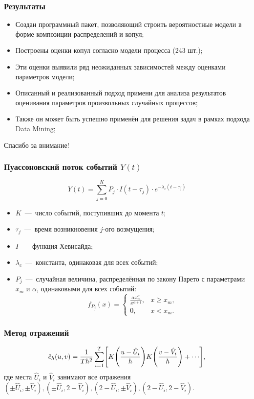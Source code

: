 \documentclass[11pt]{beamer}
\begin{document}
\begin{frame}
\begin{center}
\frametitle{Результаты}
\begin{itemize}
  \item Создан программный пакет, позволяющий строить вероятностные модели в форме композиции распределений и копул;
  \item Построены оценки копул согласно модели процесса (243 шт.);
  \item Эти оценки выявили ряд неожиданных зависимостей между оценками параметров модели;
  \item Описанный и реализованный подход примени для анализа результатов оценивания параметров произвольных случайных процессов;
  \item Также он может быть успешно применён для решения задач в рамках подхода Data Mining;
\end{itemize}
\end{center}
\end{frame}

\begin{frame}
\begin{center}
Спасибо за внимание!
\end{center}
\end{frame}

\begin{frame}
\frametitle{Пуассоновский поток событий $Y(t)$}
\[Y(t) = \sum_{j = 0}^K P_j \cdot I(t - \tau_j) \cdot e^{-\lambda_c(t - \tau_j)}\]
\begin{itemize}
  \item $K$~---~число событий, поступивших до момента $t$;
  \item $\tau_j$~---~время возникновения $j$-ого возмущения;
  \item $I$~---~функция Хевисайда;
  \item $\lambda_c$~---~константа, одинаковая для всех событий;
  \item $P_j$~---~случайная величина, распределённая по закону Парето с параметрами $x_m$ и $\alpha$, одинаковыми для всех событий:
\[
f_{P_j}(x) = \begin{cases}
\frac{\alpha x_m^\alpha}{x^{\alpha+1} }, &x \geqslant x_m,\\
0, &x < x_m.
\end{cases}
\]
\end{itemize}
\end{frame}

\begin{frame}
\frametitle{Метод отражений}
\[\hat{c}_h(u, v) = \frac{1}{Th^2}\sum_{i=1}^T\sqts*{K\brts*{\frac{u - \hat{U}_i}{h}}K\brts*{\frac{v - \hat{V}_i}{h}} + \cdots},\]
где места $\hat{U}_i$ и $\hat{V}_i$ занимают все отражения $(\pm\hat{U}_i, \pm\hat{V}_i), (\pm\hat{U}_i, 2 - \hat{V}_i), (2- \hat{U}_i, \pm\hat{V}_i), (2 - \hat{U}_i, 2- \hat{V}_i)$.
\end{frame}
\end{document}
